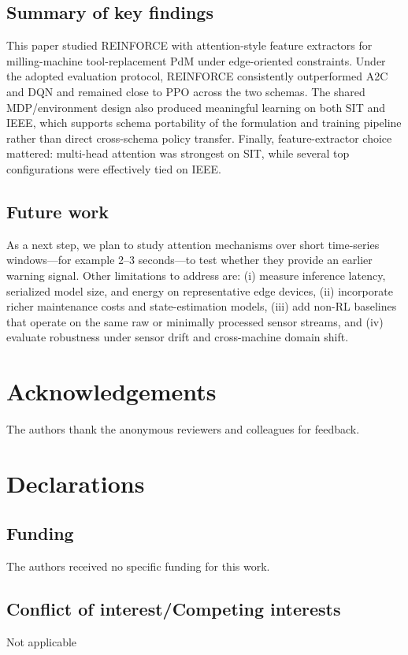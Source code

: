 \documentclass[sn-basic]{sn-jnl} %
\begin{document}
\subsection{Summary of key findings}
This paper studied \textsc{REINFORCE} with attention-style feature extractors for milling-machine tool-replacement PdM under edge-oriented constraints. Under the adopted evaluation protocol, \textsc{REINFORCE} consistently outperformed \textsc{A2C} and \textsc{DQN} and remained close to \textsc{PPO} across the two schemas. The shared MDP/environment design also produced meaningful learning on both SIT and IEEE, which supports schema portability of the formulation and training pipeline rather than direct cross-schema policy transfer. Finally, feature-extractor choice mattered: multi-head attention was strongest on SIT, while several top configurations were effectively tied on IEEE.

\subsection{Future work}
As a next step, we plan to study attention mechanisms over short time-series windows---for example 2--3 seconds---to test whether they provide an earlier warning signal. Other limitations to address are: (i) measure inference latency, serialized model size, and energy on representative edge devices, (ii) incorporate richer maintenance costs and state-estimation models, (iii) add non-RL baselines that operate on the same raw or minimally processed sensor streams, and (iv) evaluate robustness under sensor drift and cross-machine domain shift.



\section*{Acknowledgements}
The authors thank the anonymous reviewers and colleagues for feedback.

\section*{Declarations}

\subsection*{Funding}
The authors received no specific funding for this work.

\subsection*{Conflict of interest/Competing interests}
Not applicable
\end{document}
